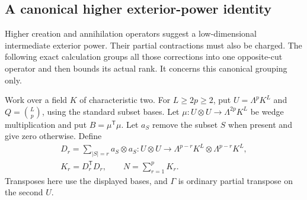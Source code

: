 \subsection{A canonical higher exterior-power identity}
\label{sec:higher-car}

Higher creation and annihilation operators suggest a low-dimensional
intermediate exterior power. Their partial contractions must also be
charged. The following exact calculation groups all those corrections
into one opposite-cut operator and then bounds its actual rank.
It concerns this canonical grouping only.

Work over a field $K$ of characteristic two. For $L\ge2p\ge2$, put
$U=\Lambda^pK^L$ and $Q=\binom Lp$, using the standard subset bases.
Let $\mu:U\otimes U\to\Lambda^{2p}K^L$ be wedge multiplication and put
$B=\mu^{\mathsf T}\mu$. Let $a_S$ remove the subset $S$ when present
and give zero otherwise. Define
\[
\begin{gathered}
 D_r=\sum_{|S|=r}a_S\otimes a_S:
 U\otimes U\longrightarrow
 \Lambda^{p-r}K^L\otimes\Lambda^{p-r}K^L,\\
 K_r=D_r^{\mathsf T}D_r,
 \qquad N=\sum_{r=1}^pK_r.
\end{gathered}
\]
Transposes here use the displayed bases, and $\Gamma$ is ordinary
partial transpose on the second $U$.

